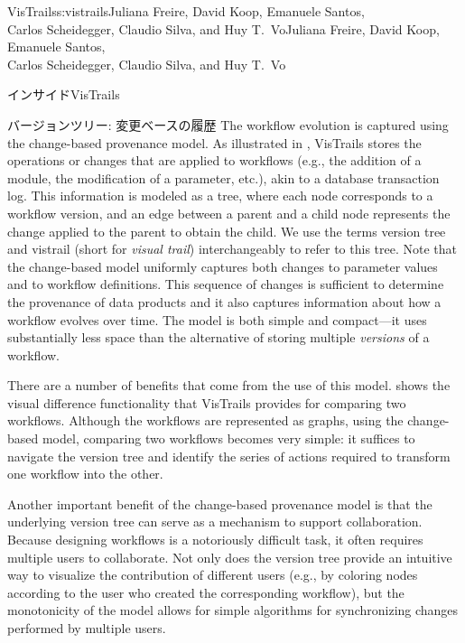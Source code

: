 \begin{aosachaptertoc}{VisTrails}{s:vistrails}{Juliana Freire, David Koop, Emanuele Santos, \\ Carlos Scheidegger, Claudio Silva, and Huy T.\ Vo}{Juliana Freire, David Koop, Emanuele Santos, \\ \hspace*{0.9cm} Carlos Scheidegger, Claudio Silva, and Huy T.\ Vo}
\begin{aosasect1}{インサイドVisTrails}
\begin{aosasect2}{バージョンツリー: 変更ベースの履歴}
The workflow evolution is captured using the change-based provenance
model.  As illustrated in ,
VisTrails stores the operations or changes that are applied to
workflows (e.g., the addition of a module, the modification of a
parameter, etc.), akin to a database transaction log.  This
information is modeled as a tree, where each node corresponds to a
workflow version, and an edge between a parent and a child node
represents the change applied to the parent to obtain the child. We
use the terms version tree and vistrail (short for \emph{visual
trail}) interchangeably to refer to this tree.  Note that the
change-based model uniformly captures both changes to parameter values
and to workflow definitions. This sequence of changes is sufficient to
determine the provenance of data products and it also captures
information about how a workflow evolves over time.  The model is both
simple and compact---it uses substantially less space than the
alternative of storing multiple \emph{versions} of a workflow.

There are a number of benefits that come from the use of this model.
 shows the visual difference
functionality that VisTrails provides for comparing two
workflows. Although the workflows are represented as graphs, using the
change-based model, comparing two workflows becomes very simple: it
suffices to navigate the version tree and identify the series of
actions required to transform one workflow into the other.

Another important benefit of the change-based provenance model is that
the underlying version tree can serve as a mechanism to support
collaboration. Because designing workflows is a notoriously difficult
task, it often requires multiple users to collaborate.  Not only does
the version tree provide an intuitive way to visualize the
contribution of different users (e.g., by coloring nodes according to
the user who created the corresponding workflow), but the monotonicity
of the model allows for simple algorithms for synchronizing changes
performed by multiple users.


\end{aosasect2}
\end{aosasect1}
\end{aosachaptertoc}
